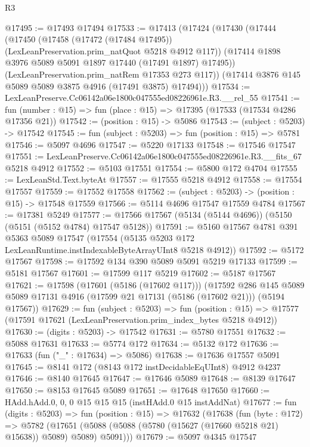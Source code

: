 \begin{lexlean}{R3}
\begin{coremodule}
@17495 := @17493 @17494
@17533 := @17413
    (@17424
      (@17430
        (@17444
          (@17450
            (@17458 (@17472 (@17484 @17495)) (LexLeanPreservation.prim_natQuot @5218 @4912 @117))
            (@17414 @1898 @3976 @5089 @5091 @1897 @17440 (@17491 @1897) @17495))
          (LexLeanPreservation.prim_natRem @17353 @273 @117))
        (@17414 @3876 @145 @5089 @5089 @3875 @4916 (@17491 @3875) @17494)))
@17534 := LexLeanPreserve.Cc06142a06e1800c047555ed08226961e.R3.__rel_55
@17541 := fun (number : @15) => fun (place : @15) => @17395 (@17533 (@17534 @4286 @17356 @21))
@17542 := (position : @15) -> @5086
@17543 := (subject : @5203) -> @17542
@17545 := fun (subject : @5203) => fun (position : @15) => @5781
@17546 := @5097 @4696
@17547 := @5220 @17133
@17548 := @17546 @17547
@17551 := LexLeanPreserve.Cc06142a06e1800c047555ed08226961e.R3.__fits_67 @5218 @4912
@17552 := @5103 @17551
@17554 := @5800 @172 @4704
@17555 := LexLeanStd.Text.byteAt
@17557 := @17555 @5218 @4912
@17558 := @17554 @17557
@17559 := @17552 @17558
@17562 := (subject : @5203) -> (position : @15) -> @17548 @17559
@17566 := @5114 @4696 @17547 @17559 @4784
@17567 := @17381 @5249
@17577 := @17566 @17567 (@5134 (@5144 @4696)) (@5150 (@5151 (@5152 @4784) @17547 @5128))
@17591 := @5160
    @17567
    @4781
    @391
    @5363
    @5089
    @17547
    (@17554 (@5135 @5203 @172 LexLeanRuntime.instIndexableByteArrayUInt8 @5218 @4912))
@17592 := @5172 @17567
@17598 := @17592 @134 @390 @5089 @5091 @5219 @17133
@17599 := @5181 @17567
@17601 := @17599 @117 @5219
@17602 := @5187 @17567
@17621 := @17598
    (@17601 (@5186 (@17602 @117)))
    (@17592
      @286
      @145
      @5089
      @5089
      @17131
      @4916
      (@17599 @21 @17131 (@5186 (@17602 @21)))
      (@5194 @17567))
@17629 := fun (subject : @5203) =>
  fun (position : @15) => @17577 (@17591 @17621 (LexLeanPreservation.prim_index_bytes @5218 @4912))
@17630 := (digits : @5203) -> @17542
@17631 := @5780 @17551
@17632 := @5088 @17631
@17633 := @5774 @172
@17634 := @5132 @172
@17636 := @17633 (fun ("_" : @17634) => @5086)
@17638 := @17636 @17557 @5091
@17645 := @8141 @172 (@8143 @172 instDecidableEqUInt8) @4912 @4237
@17646 := @8140 @17645
@17647 := @17646 @5089
@17648 := @8139 @17647
@17650 := @8153 @17645 @5089
@17651 := @17648 @17650
@17660 := HAdd.hAdd.{0, 0, 0} @15 @15 @15 (instHAdd.{0} @15 instAddNat)
@17677 := fun (digits : @5203) =>
  fun (position : @15) =>
  @17632
    (@17638
      (fun (byte : @172) =>
      @5782 (@17651 (@5088 (@5088 (@5780 (@15627 (@17660 @5218 @21) @15638)) @5089) @5089) @5091)))
@17679 := @5097 @4345 @17547

\end{coremodule}
\end{lexlean}
